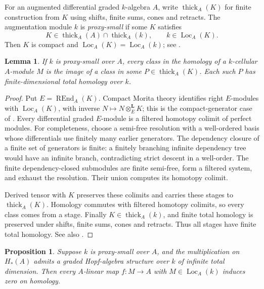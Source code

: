\documentclass[11pt]{article}
\newtheorem{lemma}[theorem]{Lemma}
\newtheorem{proposition}[theorem]{Proposition}
\newcommand{\thick}{\operatorname{thick}}
\newcommand{\Loc}{\operatorname{Loc}}
\begin{document}
For an augmented differential graded \(k\)-algebra \(A\), write \(\thick_A(K)\) for finite construction from \(K\) using shifts, finite sums, cones and retracts. The augmentation module \(k\) is \emph{proxy-small} if some \(K\) satisfies
\[
K\in\thick_A(A)\cap\thick_A(k),
\qquad k\in\Loc_A(K).
\]
Then \(K\) is compact and \(\Loc_A(K)=\Loc_A(k)\); see \cite[Definition 4.6, Remark 4.8]{DGI}.

\begin{lemma}\label{lem:approx}
If \(k\) is proxy-small over \(A\), every class in the homology of a \(k\)-cellular \(A\)-module \(M\) is the image of a class in some \(P\in\thick_A(K)\). Each such \(P\) has finite-dimensional total homology over \(k\).
\end{lemma}

\begin{proof}
Put \(E=\operatorname{REnd}_A(K)\). Compact Morita theory identifies right \(E\)-modules with \(\Loc_A(K)\), with inverse \(N\mapsto N\otimes_E^{\mathbf L}K\); this is the compact-generator case of \cite[Theorem 4.9]{DGI}. Every differential graded \(E\)-module is a filtered homotopy colimit of perfect modules. For completeness, choose a semi-free resolution with a well-ordered basis whose differentials use finitely many earlier generators. The dependency closure of a finite set of generators is finite: a finitely branching infinite dependency tree would have an infinite branch, contradicting strict descent in a well-order. The finite dependency-closed submodules are finite semi-free, form a filtered system, and exhaust the resolution. Their union computes its homotopy colimit.

Derived tensor with \(K\) preserves these colimits and carries these stages to \(\thick_A(K)\). Homology commutes with filtered homotopy colimits, so every class comes from a stage. Finally \(K\in\thick_A(k)\), and finite total homology is preserved under shifts, finite sums, cones and retracts. Thus all stages have finite total homology. See also \cite[Lemma 4.1 and its proof]{BIS}.
\end{proof}

\begin{proposition}\label{prop:criterion}
Suppose \(k\) is proxy-small over \(A\), and the multiplication on \(H_*(A)\) admits a graded Hopf-algebra structure over \(k\) of infinite total dimension. Then every \(A\)-linear map \(f:M\to A\) with \(M\in\Loc_A(k)\) induces zero on homology.
\end{proposition}
\end{document}
